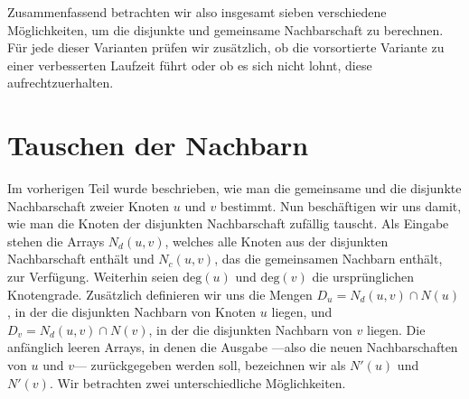 Zusammenfassend betrachten wir also insgesamt sieben verschiedene Möglichkeiten, um die disjunkte
und gemeinsame Nachbarschaft zu berechnen. Für jede dieser Varianten prüfen wir zusätzlich,
ob die vorsortierte Variante zu einer verbesserten Laufzeit führt oder ob es sich
nicht lohnt, diese aufrechtzuerhalten.



\section{Tauschen der Nachbarn}
\label{sec:trade}
Im vorherigen Teil wurde beschrieben, wie man die gemeinsame und die disjunkte Nachbarschaft zweier Knoten
$u$ und $v$ bestimmt. Nun beschäftigen wir uns damit, wie man die Knoten der disjunkten Nachbarschaft zufällig tauscht. Als Eingabe 
stehen die Arrays $N_{d}(u,v)$, welches alle Knoten aus der disjunkten Nachbarschaft enthält
und $N_{c}(u,v)$, das die gemeinsamen Nachbarn enthält, zur Verfügung. Weiterhin seien $\text{deg}(u)$ und
$\text{deg}(v)$ die ursprünglichen Knotengrade. Zusätzlich definieren wir uns die Mengen
$D_{u} = N_{d}(u,v) \cap N(u)$, in der die disjunkten Nachbarn von Knoten $u$ liegen, 
und $D_{v} = N_{d}(u,v) \cap N(v)$, in der die disjunkten Nachbarn von $v$ liegen. Die anfänglich
leeren Arrays, in denen die Ausgabe ---also die neuen Nachbarschaften von $u$ und $v$--- zurückgegeben 
werden soll, bezeichnen wir als $N'(u)$ und $N'(v)$.
Wir betrachten zwei unterschiedliche Möglichkeiten.
\\

